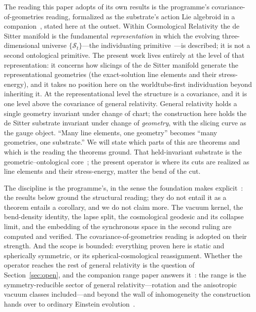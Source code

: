 \documentclass[11pt,a4paper]{article}
\theoremstyle{definition}
\begin{document}
The reading this paper adopts of its own results is the programme's covariance-of-geometries reading, formalized as the substrate's action Lie algebroid in a companion~\cite{JanzenAlgebroid}, stated here at the outset. Within Cosmological Relativity the de Sitter manifold is the fundamental \emph{representation} in which the evolving three-dimensional universe $\{\mathcal{S}_t\}$---the individuating primitive~\cite{JanzenCRframework}---is described; it is not a second ontological primitive. The present work lives entirely at the level of that representation: it concerns how slicings of the de Sitter manifold generate the representational geometries (the exact-solution line elements and their stress-energy), and it takes no position here on the worldtube-first individuation beyond inheriting it. At the representational level the structure is a covariance, and it is one level above the covariance of general relativity. General relativity holds a single geometry invariant under change of chart; the construction here holds the de Sitter substrate invariant under change of \emph{geometry}, with the slicing curve as the gauge object. ``Many line elements, one geometry'' becomes ``many geometries, one substrate.'' We will state which parts of this are theorems and which is the reading the theorems ground. That held-invariant substrate is the geometric--ontological core~\cite{JanzenGeometricCore}; the present operator is where its cuts are realized as line elements and their stress-energy, matter the bend of the cut.

The discipline is the programme's, in the sense the foundation makes explicit~\cite{JanzenShadowExistence}: the results below ground the structural reading; they do not entail it as a theorem entails a corollary, and we do not claim more. The vacuum kernel, the bend-density identity, the lapse split, the cosmological geodesic and its collapse limit, and the embedding of the synchronous space in the second ruling are computed and verified. The covariance-of-geometries reading is adopted on their strength. And the scope is bounded: everything proven here is static and spherically symmetric, or its spherical-cosmological reassignment. Whether the operator reaches the rest of general relativity is the question of Section~\ref{sec:open}, and the companion range paper answers it~\cite{JanzenRange}: the range is the symmetry-reducible sector of general relativity---rotation and the anisotropic vacuum classes included---and beyond the wall of inhomogeneity the construction hands over to ordinary Einstein evolution~\cite{JanzenDynamics}.
\end{document}
